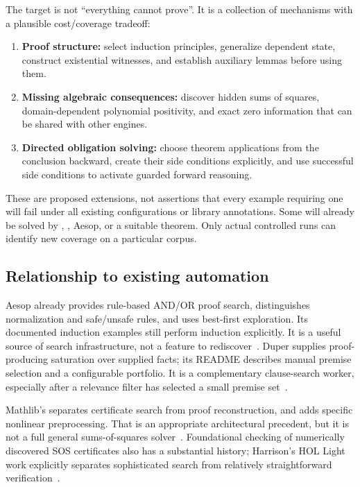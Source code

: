 The target is not ``everything \grind{} cannot prove''. It is a collection of mechanisms with a plausible cost/coverage tradeoff:

\begin{enumerate}
\item \textbf{Proof structure:} select induction principles, generalize dependent state, construct existential witnesses, and establish auxiliary lemmas before using them.
\item \textbf{Missing algebraic consequences:} discover hidden sums of squares, domain-dependent polynomial positivity, and exact zero information that can be shared with other engines.
\item \textbf{Directed obligation solving:} choose theorem applications from the conclusion backward, create their side conditions explicitly, and use successful side conditions to activate guarded forward reasoning.
\end{enumerate}

These are proposed extensions, not assertions that every example requiring one will fail under all existing \grind{} configurations or library annotations. Some will already be solved by \grind{}, , Aesop, or a suitable theorem. Only actual controlled runs can identify new coverage on a particular corpus.

\subsection{Relationship to existing automation}

Aesop already provides rule-based AND/OR proof search, distinguishes normalization and safe/unsafe rules, and uses best-first exploration. Its documented induction examples still perform induction explicitly. It is a useful source of search infrastructure, not a feature to rediscover~\cite{aesop}. Duper supplies proof-producing saturation over supplied facts; its README describes manual premise selection and a configurable portfolio. It is a complementary clause-search worker, especially after a relevance filter has selected a small premise set~\cite{duper}.

Mathlib's  separates certificate search from proof reconstruction, and  adds specific nonlinear preprocessing. That is an appropriate architectural precedent, but it is not a full general sums-of-squares solver~\cite{linarith}. Foundational checking of numerically discovered SOS certificates also has a substantial history; Harrison's HOL Light work explicitly separates sophisticated search from relatively straightforward verification~\cite{harrison}.

